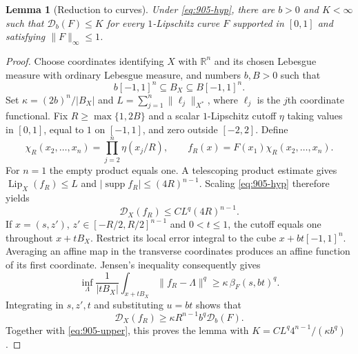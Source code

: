 \documentclass[11pt,a4paper]{article}
\newtheorem{lemma}[theorem]{Lemma}
\theoremstyle{remark}
\begin{document}
\begin{lemma}[Reduction to curves]\label{lem:905-curves}
Under \eqref{eq:905-hyp}, there are $b>0$ and $K<\infty$ such that
$\mathcal D_b(F)\leq K$ for every $1$-Lipschitz curve $F$ supported in
$[0,1]$ and satisfying $\|F\|_\infty\leq1$.
\end{lemma}
\begin{proof}
Choose coordinates identifying $X$ with $\mathbb R^n$ and its chosen
Lebesgue measure with ordinary Lebesgue measure, and numbers $b,B>0$
such that
\[
 b[-1,1]^n\subseteq B_X\subseteq B[-1,1]^n.
\]
Set $\kappa=(2b)^n/|B_X|$ and
$L=\sum_{j=1}^n\|\ell_j\|_{X^*}$, where $\ell_j$ is the $j$th coordinate
functional.  Fix $R\geq\max\{1,2B\}$ and a scalar $1$-Lipschitz cutoff
$\eta$ taking values in $[0,1]$, equal to $1$ on $[-1,1]$, and zero
outside $[-2,2]$.  Define
\[
 \chi_R(x_2,\ldots,x_n)=\prod_{j=2}^n\eta(x_j/R),
 \qquad f_R(x)=F(x_1)\chi_R(x_2,\ldots,x_n).
\]
For $n=1$ the empty product equals one.  A telescoping product estimate
gives $\operatorname{Lip}_X(f_R)\leq L$ and
$|\operatorname{supp}f_R|\leq(4R)^{n-1}$.  Scaling
\eqref{eq:905-hyp} therefore yields
\begin{equation}\label{eq:905-upper}
 \mathcal D_X(f_R)\leq CL^q(4R)^{n-1}.
\end{equation}
If $x=(s,z')$, $z'\in[-R/2,R/2]^{n-1}$ and $0<t\leq1$, the cutoff
equals one throughout $x+tB_X$.  Restrict its local error integral to
the cube $x+bt[-1,1]^n$.  Averaging an affine map in the transverse
coordinates produces an affine function of its first coordinate.
Jensen's inequality consequently gives
\[
 \inf_\Lambda\frac1{|tB_X|}\int_{x+tB_X}\|f_R-\Lambda\|^q
 \geq\kappa\,\beta_F(s,bt)^q.
\]
Integrating in $s,z',t$ and substituting $u=bt$ shows that
\[
 \mathcal D_X(f_R)\geq\kappa R^{n-1}b^q\mathcal D_b(F).
\]
Together with \eqref{eq:905-upper}, this proves the lemma with
$K=CL^q4^{n-1}/(\kappa b^q)$.
\end{proof}
\end{document}
